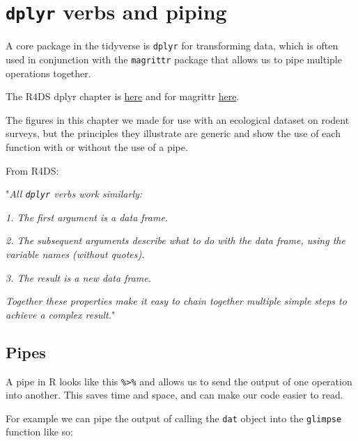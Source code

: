\documentclass[12pt,]{book}
\newenvironment{Shaded}{\begin{snugshade}}{\end{snugshade}}
\newcommand{\KeywordTok}[1]{\textcolor[rgb]{0.13,0.29,0.53}{\textbf{#1}}}
\newcommand{\NormalTok}[1]{#1}
\newcommand{\OperatorTok}[1]{\textcolor[rgb]{0.81,0.36,0.00}{\textbf{#1}}}
\newcommand{\StringTok}[1]{\textcolor[rgb]{0.31,0.60,0.02}{#1}}
\begin{document}
\hypertarget{dplyr}{%
\chapter{\texorpdfstring{\texttt{dplyr} verbs and piping}{dplyr verbs and piping}}\label{dplyr}}

A core package in the tidyverse is \texttt{dplyr} for transforming data, which is often
used in conjunction with the \texttt{magrittr} package that allows us to pipe multiple
operations together.

The R4DS dplyr chapter is \href{http://r4ds.had.co.nz/transform.html}{here} and for
magrittr \href{http://r4ds.had.co.nz/pipes.html}{here}.

The figures in this chapter we made for use with an ecological dataset on rodent
surveys, but the principles they illustrate are generic and show the use of
each function with or without the use of a pipe.

From R4DS:

"\emph{All \texttt{dplyr} verbs work similarly:}

\emph{1. The first argument is a data frame.}

\emph{2. The subsequent arguments describe what to do with the data frame, using the variable names (without quotes).}

\emph{3. The result is a new data frame.}

\emph{Together these properties make it easy to chain together multiple simple steps to achieve a complex result.}"

\hypertarget{pipes}{%
\section{Pipes}\label{pipes}}

A pipe in R looks like this \texttt{\%\textgreater{}\%} and allows us to send the output of one
operation into another. This saves time and space, and can make our code easier
to read.

For example we can pipe the output of calling the \texttt{dat} object into the \texttt{glimpse}
function like so:

\begin{Shaded}
\end{Shaded}
\end{document}
